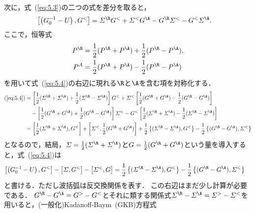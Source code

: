 \documentclass[a4paper,10pt]{jsarticle}
\begin{document}
次に，式~(\ref{eq:5.3})の二つの式を差分を取ると，
\begin{align}
\left[ \left( G_0^{-1} - U \right), G^{<} \right]
	& = \varSigma^{\R} G^{<} + \varSigma^{<} G^{\A} - G^{\R} \varSigma^{<} - G^{<} \varSigma^{\A}
\label{eq:5.4}
.\end{align}
ここで，恒等式
\begin{align}
P^{\R}
	& = \frac{1}{2} ( P^{\R} + P^{\A} ) + \frac{1}{2} ( P^{\R} - P^{\A} )
, \notag \\
P^{A}
	& = \frac{1}{2} ( P^{\R} + P^{\A} ) - \frac{1}{2} ( P^{\R} - P^{\A} )
\end{align}
を用いて式~(\ref{eq:5.4})の右辺に現れる$\R$と$\A$を含む項を対称化する．
\begin{align*}
\text{(\ref{eq:5.4})}
	& = \left[ \frac{1}{2} ( \varSigma^{\R} + \varSigma^{\A} ) + \frac{1}{2} ( \varSigma^{\R} - \varSigma^{\A} ) \right] G^{<}
		+ \varSigma^{<} \left[ \frac{1}{2} ( G^{\R} + G^{\A} ) - \frac{1}{2} ( G^{\R} - G^{\A} ) \right]
\\	& \hspace{1em}
		- \left[ \frac{1}{2} ( G^{\R} + G^{\A} ) + \frac{1}{2} ( G^{\R} - G^{\A} ) \right] \varSigma^{<}
		- G^{<} \left[ \frac{1}{2} ( \varSigma^{\R} + \varSigma^{\A} ) - \frac{1}{2} ( \varSigma^{\R} - \varSigma^{\A} ) \right]
\\	& = \left[ \frac{1}{2} ( \varSigma^{\R} + \varSigma^{\A} ), G^{<} \right]
		+ \left[ \varSigma^{<}, \frac{1}{2} ( G^{\R} + G^{\A} ) \right]
		+ \frac{1}{2} \left\{ ( \varSigma^{\R} - \varSigma^{\A} ), G^{<} \right\}
		- \frac{1}{2} \left\{ ( G^{\R} - G^{\A} ), \varSigma^{<} \right\}
\end{align*}
となるので，結局，$\varSigma = \frac{1}{2} ( \varSigma^{\R} + \varSigma^{\A} )$と$G = \frac{1}{2} (G^{\R} + G^{\A})$という量を導入すると，式~(\ref{eq:5.4})は
\begin{align}
\left[ \left( G_0^{-1} - U \right), G^{<} \right]
	- \left[ \varSigma, G^{<} \right]
	- \left[ \varSigma^{<}, G \right]
	& = \frac{1}{2} \left\{ ( \varSigma^{\R} - \varSigma^{\A} ), G^{<} \right\}
		- \frac{1}{2} \left\{ ( G^{\R} - G^{\A} ), \varSigma^{<} \right\}
\label{eq:5.6}
\end{align}
と書ける．ただし波括弧は反交換関係を表す．
この右辺はまだ少し計算が必要である．
$G^{\R} - G^{\A} = G^{>} - G^{<}$とそれに類する関係式$\varSigma^{\R} - \varSigma^{\A} = \varSigma^{>} - \varSigma^{<}$を用いると，(一般化)Kadanoff-Baym~(GKB)方程式
\end{document}
